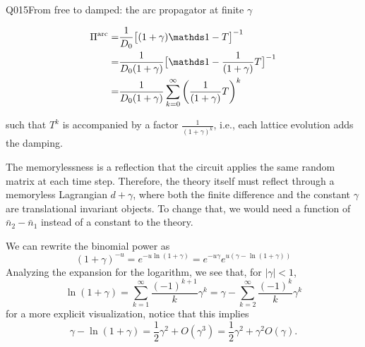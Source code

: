 \begin{entry}{Q015}{From free to damped: the arc propagator at finite $\gamma$}
\begin{solution}[d]
\begin{equation}
\begin{split}
    \Pi^{\text{arc}}=&\frac{1}{D_0} \bigl[(1+\gamma)\id-T\bigr]^{-1}\\
    =& \frac{1}{D_0 (1+\gamma)} \bigl[\id- \frac{1}{(1+\gamma)}T\bigr]^{-1}\\
    =& \frac{1}{D_0 (1+\gamma)} \sum_{k=0}^\infty \left(\frac{1}{(1+\gamma)}T\right)^k
\end{split}
\end{equation}

such that $T^k$ is accompanied by a factor $\frac{1}{(1+\gamma)^k}$, i.e., each lattice evolution adds the damping.

The memorylessness is a reflection that the circuit applies the same random matrix at each time step. Therefore, the theory itself must reflect through a memoryless Lagrangian $d + \gamma$, where both the finite difference and the constant $\gamma$ are translational invariant objects. To change that, we would need a function of $\bar n_2 -\bar n_1$ instead of a constant to the theory. 

\end{solution}






\begin{solution}[e]
We can rewrite the binomial power as
\begin{equation}
    (1+\gamma)^{-u} = e^{-u\ln(1+\gamma)} = e^{-u \gamma } e^{u(\gamma -\ln (1+\gamma))}
\end{equation}
Analyzing the expansion for the logarithm, we see that, for $|\gamma|<1$,
\begin{equation*}
    \ln(1+\gamma)=\sum_{k=1}^{\infty} \frac{(-1)^{k+1}}{k} \gamma^k = \gamma - \sum_{k=2}^{\infty} \frac{(-1)^{k}}{k} \gamma^k 
\end{equation*}
for a more explicit visualization, notice that this implies
\begin{equation}
    \gamma - \ln(1+\gamma) = \frac{1}{2}\gamma^2 + O(\gamma^3) =  \frac{1}{2}\gamma^2 + \gamma^2O(\gamma).
    \label{order magnitude}
\end{equation}


\end{solution}
\end{entry}
